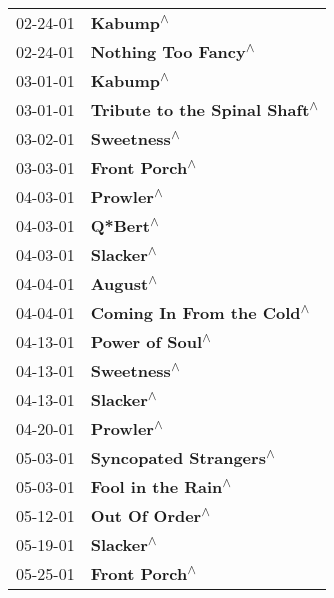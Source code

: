 \begin{supertabular}{p{0.25\columnwidth}p{0.75\columnwidth}}
 02-24-01 &                                   \textbf{Kabump\textsuperscript{$\wedge$}} \\
 02-24-01 &                        \textbf{Nothing Too Fancy\textsuperscript{$\wedge$}} \\
 03-01-01 &                                   \textbf{Kabump\textsuperscript{$\wedge$}} \\
 03-01-01 &              \textbf{Tribute to the Spinal Shaft\textsuperscript{$\wedge$}} \\
 03-02-01 &                                \textbf{Sweetness\textsuperscript{$\wedge$}} \\
 03-03-01 &                              \textbf{Front Porch\textsuperscript{$\wedge$}} \\
 04-03-01 &                                  \textbf{Prowler\textsuperscript{$\wedge$}} \\
 04-03-01 &                                   \textbf{Q*Bert\textsuperscript{$\wedge$}} \\
 04-03-01 &                                  \textbf{Slacker\textsuperscript{$\wedge$}} \\
 04-04-01 &                                   \textbf{August\textsuperscript{$\wedge$}} \\
 04-04-01 &                  \textbf{Coming In From the Cold\textsuperscript{$\wedge$}} \\
 04-13-01 &                            \textbf{Power of Soul\textsuperscript{$\wedge$}} \\
 04-13-01 &                                \textbf{Sweetness\textsuperscript{$\wedge$}} \\
 04-13-01 &                                  \textbf{Slacker\textsuperscript{$\wedge$}} \\
 04-20-01 &                                  \textbf{Prowler\textsuperscript{$\wedge$}} \\
 05-03-01 &                     \textbf{Syncopated Strangers\textsuperscript{$\wedge$}} \\
 05-03-01 &                         \textbf{Fool in the Rain\textsuperscript{$\wedge$}} \\
 05-12-01 &                             \textbf{Out Of Order\textsuperscript{$\wedge$}} \\
 05-19-01 &                                  \textbf{Slacker\textsuperscript{$\wedge$}} \\
 05-25-01 &                              \textbf{Front Porch\textsuperscript{$\wedge$}} \\

\end{supertabular}
